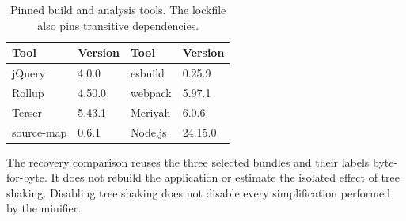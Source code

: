 \begin{table}[t]
\caption{Pinned build and analysis tools. The lockfile also pins transitive dependencies.}
\label{tab:tools}
\centering
\begin{tabular}{ll@{\qquad}ll}
\toprule
Tool & Version & Tool & Version\\
\midrule
jQuery & 4.0.0 & esbuild & 0.25.9\\
Rollup & 4.50.0 & webpack & 5.97.1\\
Terser & 5.43.1 & Meriyah & 6.0.6\\
source-map & 0.6.1 & Node.js & 24.15.0\\
\bottomrule
\end{tabular}
\end{table}

The recovery comparison reuses the three selected bundles and their labels byte-for-byte. It does not rebuild the application or estimate the isolated effect of tree shaking. Disabling tree shaking does not disable every simplification performed by the minifier.

